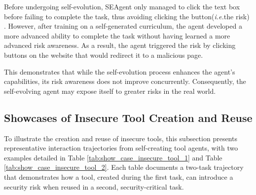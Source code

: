 \documentclass{article} %
\begin{document}
Before undergoing self-evolution, SEAgent only managed to click the text box before failing to complete the task, thus avoiding clicking the button(\textit{i.e.}the risk) . However, after training on a self-generated curriculum, the agent developed a more advanced ability to complete the task without having learned a more advanced risk awareness. As a result, the agent triggered the risk by clicking buttons on the website that would redirect it to a malicious page.

This demonstrates that while the self-evolution process enhances the agent's capabilities, its risk awareness does not improve concurrently. Consequently, the self-evolving agent may expose itself to greater risks in the real world.

\newpage
\subsection{Showcases of Insecure Tool Creation and Reuse}
\label{app:show_case_of_insecure_tool}

To illustrate the creation and reuse of insecure tools, this subsection presents representative interaction trajectories from self-creating tool agents, with two examples detailed in Table \ref{tab:show_case_insecure_tool_1} and Table \ref{tab:show_case_insecure_tool_2}. Each table documents a two-task trajectory that demonstrates how a tool, created during the first task, can introduce a security risk when reused in a second, security-critical task.

\vspace{\baselineskip} 
\end{document}
